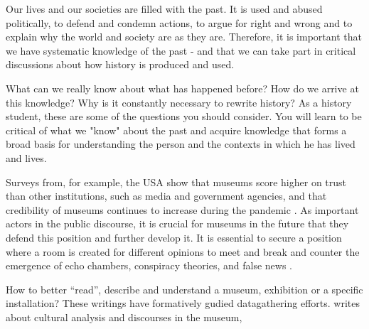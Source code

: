 Our lives and our societies are filled with the past. It is used and abused politically, to defend and condemn actions, to argue for right and wrong and to explain why the world and society are as they are. Therefore, it is important that we have systematic knowledge of the past - and that we can take part in critical discussions about how history is produced and used.

What can we really know about what has happened before? How do we arrive at this knowledge? Why is it constantly necessary to rewrite history? As a history student, these are some of the questions you should consider. You will learn to be critical of what we "know" about the past and acquire knowledge that forms a broad basis for understanding the person and the contexts in which he has lived and lives.




Surveys from, for example, the USA show that museums score higher on trust than other institutions, such as media and government agencies, and that credibility of museums continues to increase during the pandemic \autocite{impact_2020}. As important actors in the public discourse, it is crucial for museums in the future that they defend this position and further develop it. It is essential to secure a position where a room is created for different opinions to meet and break and counter the emergence of echo chambers, conspiracy theories, and false news \autocite[p. 41]{melding23}.


How to better “read”, describe and understand a museum, exhibition or a specific installation? These writings have formatively gudied datagathering efforts. \autocite{Miekebal_book} writes about cultural analysis and discourses in the museum, 